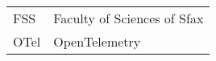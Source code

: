 \begin{longtable*}{p{3cm}p{10cm}}
	FSS & Faculty of Sciences of Sfax \\
	OTel & OpenTelemetry \\
\end{longtable*}
